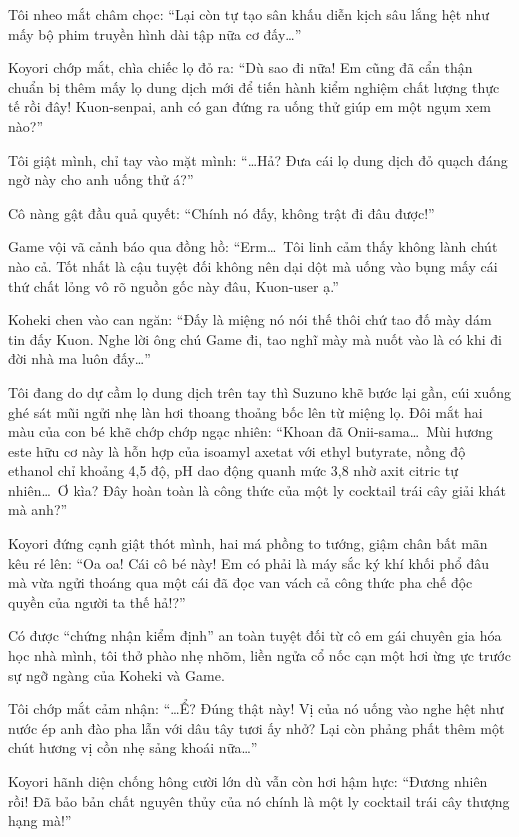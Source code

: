 \documentclass[../main.tex]{subfiles}
\begin{document}
Tôi nheo mắt châm chọc: ``Lại còn tự tạo sân khấu diễn kịch sâu lắng hệt như mấy bộ phim truyền hình dài tập nữa cơ đấy\dots''

Koyori chớp mắt, chìa chiếc lọ đỏ ra: ``Dù sao đi nữa! Em cũng đã cẩn thận chuẩn bị thêm mấy lọ dung dịch mới để tiến hành kiểm nghiệm chất lượng thực tế rồi đây! Kuon-senpai, anh có gan đứng ra uống thử giúp em một ngụm xem nào?''

Tôi giật mình, chỉ tay vào mặt mình: ``\dots Hả? Đưa cái lọ dung dịch đỏ quạch đáng ngờ này cho anh uống thử á?''

Cô nàng gật đầu quả quyết: ``Chính nó đấy, không trật đi đâu được!''

Game vội vã cảnh báo qua đồng hồ: ``Erm\dots\ Tôi linh cảm thấy không lành chút nào cả. Tốt nhất là cậu tuyệt đối không nên dại dột mà uống vào bụng mấy cái thứ chất lỏng vô rõ nguồn gốc này đâu, Kuon-user ạ.''

Koheki chen vào can ngăn: ``Đấy là miệng nó nói thế thôi chứ tao đố mày dám tin đấy Kuon. Nghe lời ông chú Game đi, tao nghĩ mày mà nuốt vào là có khi đi đời nhà ma luôn đấy\dots''

Tôi đang do dự cầm lọ dung dịch trên tay thì Suzuno khẽ bước lại gần, cúi xuống ghé sát mũi ngửi nhẹ làn hơi thoang thoảng bốc lên từ miệng lọ. Đôi mắt hai màu của con bé khẽ chớp chớp ngạc nhiên: ``Khoan đã Onii-sama\dots\ Mùi hương este hữu cơ này là hỗn hợp của isoamyl axetat với ethyl butyrate, nồng độ ethanol chỉ khoảng 4,5 độ, pH dao động quanh mức 3,8 nhờ axit citric tự nhiên\dots\ Ơ kìa? Đây hoàn toàn là công thức của một ly cocktail trái cây giải khát mà anh?''

Koyori đứng cạnh giật thót mình, hai má phồng to tướng, giậm chân bất mãn kêu ré lên: ``Oa oa! Cái cô bé này! Em có phải là máy sắc ký khí khối phổ đâu mà vừa ngửi thoáng qua một cái đã đọc van vách cả công thức pha chế độc quyền của người ta thế hả!?''

Có được ``chứng nhận kiểm định'' an toàn tuyệt đối từ cô em gái chuyên gia hóa học nhà mình, tôi thở phào nhẹ nhõm, liền ngửa cổ nốc cạn một hơi ừng ực trước sự ngỡ ngàng của Koheki và Game.

Tôi chớp mắt cảm nhận: ``\dots Ể? Đúng thật này! Vị của nó uống vào nghe hệt như nước ép anh đào pha lẫn với dâu tây tươi ấy nhở? Lại còn phảng phất thêm một chút hương vị cồn nhẹ sảng khoái nữa\dots''

Koyori hãnh diện chống hông cười lớn dù vẫn còn hơi hậm hực: ``Đương nhiên rồi! Đã bảo bản chất nguyên thủy của nó chính là một ly cocktail trái cây thượng hạng mà!''
\end{document}
